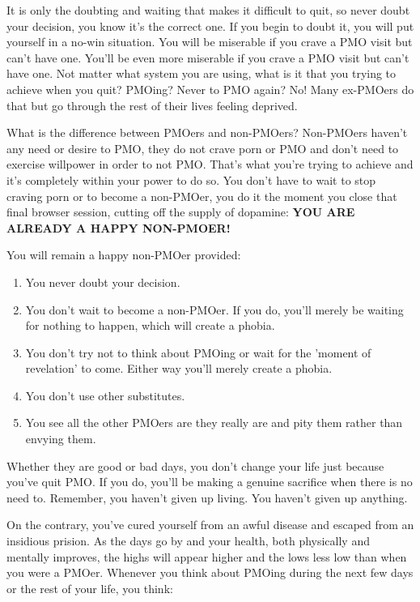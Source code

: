 \documentclass[easypeasy.tex]{subfiles}
\begin{document}
It is only the doubting and waiting that makes it difficult to quit, so never doubt your decision, you know it's the correct one. If you begin to doubt it, you will put yourself in a no-win situation. You will be miserable if you crave a PMO visit but can't have one. You'll be even more miserable if you crave a PMO visit but can't have one. Not matter what system you are using, what is it that you trying to achieve when you quit? PMOing? Never to PMO again? No! Many ex-PMOers do that but go through the rest of their lives feeling deprived.

What is the difference between PMOers and non-PMOers? Non-PMOers haven't any need or desire to PMO, they do not crave porn or PMO and don't need to exercise willpower in order to not PMO. That's what you're trying to achieve and it's completely within your power to do so. You don't have to wait to stop craving porn or to become a non-PMOer, you do it the moment you close that final browser session, cutting off the supply of dopamine: \textbf{YOU ARE ALREADY A HAPPY NON-PMOER!}

  You will remain a happy non-PMOer provided:
\begin{enumerate}
  \item You never doubt your decision.
  \item You don't wait to become a non-PMOer. If you do, you'll merely be waiting for nothing to happen, which will create a phobia.
  \item You don't try not to think about PMOing or wait for the 'moment of revelation' to come. Either way you'll merely create a phobia.
  \item You don't use other substitutes.
  \item You see all the other PMOers are they really are and pity them rather than envying them.
\end{enumerate}
  
Whether they are good or bad days, you don't change your life just because you've quit PMO. If you do, you'll be making a genuine sacrifice when there is no need to. Remember, you haven't given up living. You haven't given up anything.

On the contrary, you've cured yourself from an awful disease and escaped from an insidious prision. As the days go by and your health, both physically and mentally improves, the highs will appear higher and the lows less low than when you were a PMOer. Whenever you think about PMOing during the next few days or the rest of your life, you think:
\end{document}
